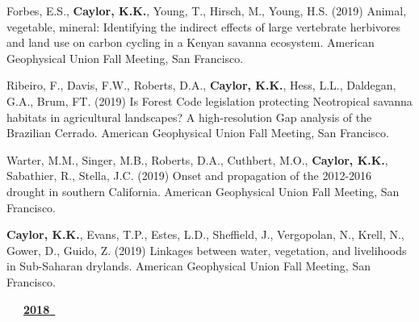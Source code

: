 \begin{etaremune}
\item Forbes, E.S., \textbf{ Caylor, K.K.}, Young, T., Hirsch, M., Young, H.S. (2019) Animal, vegetable, mineral: Identifying the indirect effects of large vertebrate herbivores and land use on carbon cycling in a Kenyan savanna ecosystem. American Geophysical Union Fall Meeting, San Francisco.
\item Ribeiro, F., Davis, F.W., Roberts, D.A., \textbf{ Caylor, K.K.}, Hess, L.L., Daldegan, G.A., Brum, FT. (2019) Is Forest Code legislation protecting Neotropical savanna habitats in agricultural landscapes? A high-resolution Gap analysis of the Brazilian Cerrado. American Geophysical Union Fall Meeting, San Francisco.
\item Warter, M.M., Singer, M.B., Roberts, D.A., Cuthbert, M.O., \textbf{ Caylor, K.K.}, Sabathier, R., Stella, J.C. (2019) Onset and propagation of the 2012-2016 drought in southern California. American Geophysical Union Fall Meeting, San Francisco.
\item \textbf{ Caylor, K.K.}, Evans, T.P., Estes, L.D., Sheffield, J., Vergopolan, N., Krell, N., Gower, D., Guido, Z. (2019) Linkages between water, vegetation, and livelihoods in Sub-Saharan drylands. American Geophysical Union Fall Meeting, San Francisco.

\vspace{0.1in}
\mbox{\ \ \ \underline{\textbf{2018 }}}
\vspace{0.1in}


\end{etaremune}

